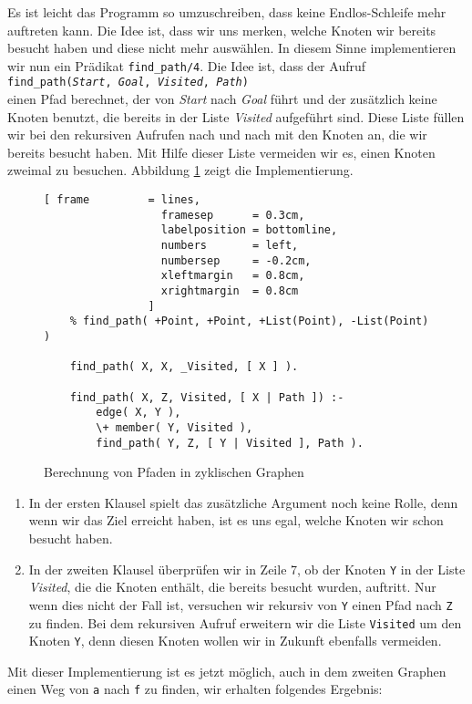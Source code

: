 Es ist leicht das Programm so umzuschreiben, dass keine Endlos-Schleife mehr
auftreten kann.  Die Idee ist, dass wir uns merken, welche Knoten wir bereits besucht
haben und diese nicht mehr auswählen.  In diesem Sinne implementieren wir nun ein Prädikat \texttt{find\_path/4}.
Die Idee ist, dass der Aufruf \\[0.1cm]
\hspace*{1.3cm} \texttt{find\_path(\textsl{Start}, \textsl{Goal}, \textsl{Visited}, \textsl{Path})} \\[0.1cm]
einen Pfad berechnet, der von \textsl{Start} nach \textsl{Goal} führt und der zusätzlich
keine Knoten benutzt, die bereits in der Liste \textsl{Visited} aufgeführt sind.  Diese Liste
füllen wir bei den rekursiven Aufrufen nach und nach mit den Knoten an, die wir bereits
besucht haben.  Mit Hilfe dieser Liste vermeiden wir es, einen Knoten zweimal zu besuchen.
Abbildung \ref{fig:connect2} zeigt die Implementierung.
\begin{figure}[!h]
  \centering
\begin{Verbatim}[ frame         = lines, 
                  framesep      = 0.3cm, 
                  labelposition = bottomline,
                  numbers       = left,
                  numbersep     = -0.2cm,
                  xleftmargin   = 0.8cm,
                  xrightmargin  = 0.8cm
                ]
    % find_path( +Point, +Point, +List(Point), -List(Point) )

    find_path( X, X, _Visited, [ X ] ).
    
    find_path( X, Z, Visited, [ X | Path ]) :-
        edge( X, Y ),
        \+ member( Y, Visited ),
        find_path( Y, Z, [ Y | Visited ], Path ).
    \end{Verbatim}
\vspace*{-0.3cm}
  \caption{Berechnung von Pfaden in zyklischen Graphen}
  \label{fig:connect2}
\end{figure}
\begin{enumerate}
\item In der ersten Klausel spielt das zusätzliche Argument noch keine Rolle,
      denn wenn wir das Ziel erreicht haben, ist es uns egal, welche Knoten wir schon
      besucht haben.
\item In der zweiten Klausel überprüfen wir in Zeile 7, ob der Knoten \texttt{Y}
      in der Liste \textsl{Visited}, die die Knoten enthält, die bereits besucht wurden,
      auftritt.  Nur wenn dies nicht der Fall ist, versuchen wir rekursiv von \texttt{Y}
      einen Pfad nach \texttt{Z} zu finden.  Bei dem rekursiven Aufruf erweitern wir die Liste
      \texttt{Visited} um den Knoten \texttt{Y}, denn diesen Knoten wollen wir in Zukunft
      ebenfalls vermeiden.
\end{enumerate}
Mit dieser Implementierung ist es jetzt möglich, auch in dem zweiten Graphen einen Weg von
\texttt{a} nach \texttt{f} zu finden, wir erhalten folgendes Ergebnis:
\pagebreak

